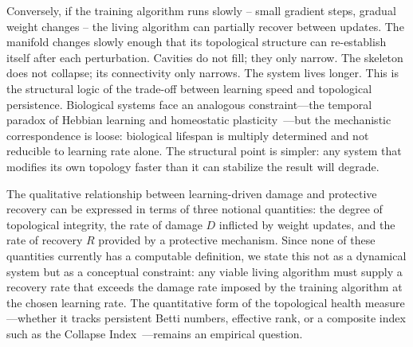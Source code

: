 \documentclass{article}
\begin{document}
Conversely, if the training algorithm runs slowly -- small gradient steps, gradual weight changes -- the living algorithm can partially recover between updates. The manifold changes slowly enough that its topological structure can re-establish itself after each perturbation. Cavities do not fill; they only narrow. The skeleton does not collapse; its connectivity only narrows. The system lives longer. This is the structural logic of the trade-off between learning speed and topological persistence. Biological systems face an analogous constraint---the temporal paradox of Hebbian learning and homeostatic plasticity~\citep{Zenke2017temporal}---but the mechanistic correspondence is loose: biological lifespan is multiply determined and not reducible to learning rate alone. The structural point is simpler: any system that modifies its own topology faster than it can stabilize the result will degrade.

The qualitative relationship between learning-driven damage and protective recovery can be expressed in terms of three notional quantities: the degree of topological integrity, the rate of damage $D$ inflicted by weight updates, and the rate of recovery $R$ provided by a protective mechanism. Since none of these quantities currently has a computable definition, we state this not as a dynamical system but as a conceptual constraint: any viable living algorithm must supply a recovery rate that exceeds the damage rate imposed by the training algorithm at the chosen learning rate. The quantitative form of the topological health measure---whether it tracks persistent Betti numbers, effective rank, or a composite index such as the Collapse Index~\citep{Kalinowski2026collapse}---remains an empirical question.
\end{document}
